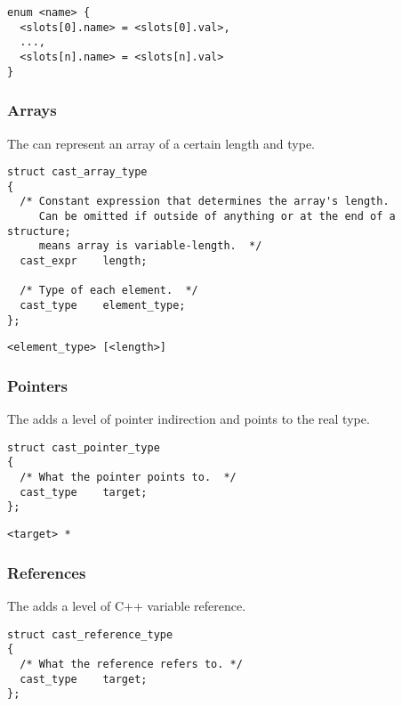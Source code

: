 \begin{verbatim}
enum <name> {
  <slots[0].name> = <slots[0].val>,
  ...,
  <slots[n].name> = <slots[n].val>
}
\end{verbatim}

\subsubsection{Arrays}

The  can represent an array of a certain length and
type.

\begin{verbatim}
struct cast_array_type
{
  /* Constant expression that determines the array's length.
     Can be omitted if outside of anything or at the end of a structure;
     means array is variable-length.  */
  cast_expr    length;

  /* Type of each element.  */
  cast_type    element_type;
};
\end{verbatim}

\begin{verbatim}
<element_type> [<length>]
\end{verbatim}

\subsubsection{Pointers}

The  adds a level of pointer indirection and points
to the real type.

\begin{verbatim}
struct cast_pointer_type
{
  /* What the pointer points to.  */
  cast_type    target;
};
\end{verbatim}

\begin{verbatim}
<target> *
\end{verbatim}

\subsubsection{References}

The  adds a level of C++ variable reference.

\begin{verbatim}
struct cast_reference_type
{
  /* What the reference refers to. */
  cast_type    target;
};
\end{verbatim}

